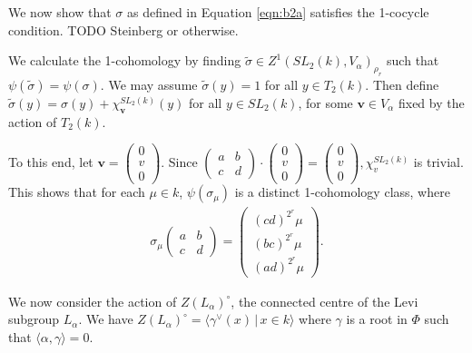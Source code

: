 We now show that $\sigma$ as defined in Equation \ref{eqn:b2a} satisfies the 1-cocycle condition. TODO Steinberg or otherwise.

We calculate the 1-cohomology by finding $\widetilde{\sigma}\in Z^1(SL_2(k), V_\alpha)_{\rho_r}$ such that $\psi(\widetilde{\sigma}) = \psi(\sigma)$. We may assume $\widetilde{\sigma}(y) = 1$ for all $y \in T_2(k)$. Then define $\widetilde{\sigma}(y) = \sigma(y) + \chi^{SL_2(k)}_\mathbf{v}(y)$ for all $y\in SL_2(k)$, for some $\mathbf{v}\in V_\alpha$ fixed by the action of $T_2(k)$.

To this end, let $\mathbf{v} = \left(\begin{matrix}0\\v\\0\end{matrix}\right)$. Since
	$\left(\begin{matrix}a & b\\c & d\end{matrix}\right) \cdot \left(\begin{matrix}0\\v\\0\end{matrix}\right) =
	\left(\begin{matrix}0\\v\\0\end{matrix}\right),
\chi^{SL_2(k)}_v$ is trivial.
This shows that for each $\mu\in k$, $\psi(\sigma_\mu)$ is a distinct 1-cohomology class, where
\begin{align*}
	\sigma_\mu\left(\begin{matrix}a & b\\c & d\end{matrix}\right) = \left(\begin{matrix}(cd)^{2^r}\mu\\(bc)^{2^r}\mu\\(ad)^{2^r}\mu\end{matrix}\right).
\end{align*}

We now consider the action of $Z(L_\alpha)^\circ$, the connected centre of the Levi subgroup $L_\alpha$. We have $Z(L_\alpha)^\circ = \langle \gamma^\vee(x)\,|\,x \in k \rangle$ where $\gamma$ is a root in $\Phi$ such that $\langle \alpha, \gamma \rangle = 0$.

